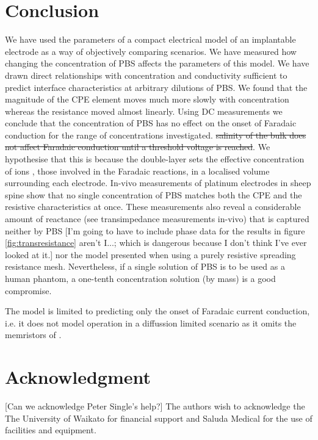 \documentclass[journal, a4paper]{IEEEtran}
\begin{document}
\section{Conclusion}
\label{sect:conclusion}
We have used the parameters of a compact electrical model of an implantable electrode as a way of objectively comparing scenarios.
We have measured how changing the concentration of PBS affects the parameters of this model.
We have drawn direct relationships with concentration {\color{blue} and conductivity} sufficient to predict interface characteristics at arbitrary dilutions of PBS.
We found that the magnitude of the CPE element moves much more slowly with concentration whereas the resistance moved almost linearly.
Using DC measurements we conclude that the {\color{blue} concentration of PBS has no effect on the onset of Faradaic conduction for the range of concentrations investigated.} {\color{Green} \sout{salinity of the bulk does not affect Faradaic conduction until a threshold voltage is reached}}. We hypothesise that this is because the double-layer sets the effective concentration of ions {\color{blue}, those involved in the Faradaic reactions,} in a localised volume surrounding each electrode.
In-vivo measurements of platinum electrodes in sheep spine show that no single concentration of PBS matches both the CPE and the resistive characteristics at once. {\color{blue} These measurements also reveal a considerable amount of reactance (see transimpedance measurements in-vivo) that is captured neither by PBS {\color{red} [I'm going to have to include phase data for the results in figure \ref{fig:transresistance} aren't I...; which is dangerous because I don't think I've ever looked at it.]} nor the model presented when using a purely resistive spreading resistance mesh.} Nevertheless, {\color{blue}if a single solution of PBS is to be used as a human phantom, a one-tenth concentration solution (by mass)} is a good compromise.

{
    \color{blue}
    The model is limited to predicting only the onset of Faradaic current conduction, i.e. it does not model operation in a diffussion limited scenario as it omits the memristors of \cite{ScottSingle2013}.
}

\section*{Acknowledgment}
{\color{red} [Can we acknowledge Peter Single's help?]} The authors wish to acknowledge the The University of Waikato for financial support and Saluda Medical for the use of facilities and equipment.
\end{document}
